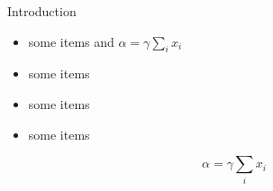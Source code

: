 \documentclass[final, hyperref={pdfpagelabels=false}]{beamer}
\begin{document}
\begin{frame}{}
\begin{columns}[t]
\begin{column}{.48\linewidth}
    \begin{block}{Introduction}
        \begin{itemize}
        \item some items and $\alpha=\gamma \sum_{i} x_i$
        \item some items
        \item some items
        \item some items
        \end{itemize}
        $$\alpha=\gamma \sum_{i} x_i $$
    \end{block}
    \end{column}
\end{columns}
\end{frame}
\end{document}
